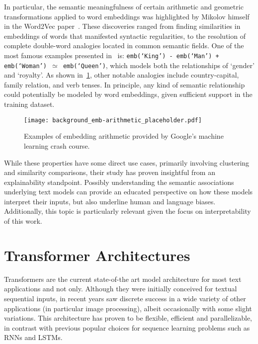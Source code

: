 In particular, the semantic meaningfulness of certain arithmetic and geometric transformations applied to word embeddings was highlighted by Mikolov himself in the Word2Vec paper~\cite{mikolov2013}.
These discoveries ranged from finding similarities in embeddings of words that manifested syntactic regularities, to the resolution of complete double-word analogies located in common semantic fields.
One of the most famous examples presented in~\cite{mikolov2013} is: \texttt{emb(`King') - emb(`Man') + emb(`Woman') $\simeq$ emb(`Queen')}, which models both the relationships of `gender' and `royalty'. %
As shown in~\cref{fig:background_emb-arithmetic}, other notable analogies include country-capital, family relation, and verb tenses.
In principle, any kind of semantic relationship could potentially be modeled by word embeddings, given sufficient support in the training dataset.

\begin{figure}[t!]
    \centering
    \texttt{[image: background\_emb-arithmetic\_placeholder.pdf]}
    \caption[Examples of embedding arithmetic provided by Google's machine learning crash course]{Examples of embedding arithmetic provided by Google's machine learning crash course\footnotemark.}
    \label{fig:background_emb-arithmetic}
\end{figure}

While these properties have some direct use cases, primarily involving clustering and similarity comparisons, their study has proven insightful from an explainability standpoint.
Possibly understanding the semantic associations underlying text models can provide an educated perspective on how these models interpret their inputs, but also underline human and language biases.
Additionally, this topic is particularly relevant given the focus on interpretability of this work.

\section{Transformer Architectures}

Transformers are the current state-of-the art model architecture for most text applications and not only.
Although they were initially conceived for textual sequential inputs, in recent years saw discrete success in a wide variety of other applications (in particular image processing), albeit occasionally with some slight variations.
This architecture has proven to be flexible, efficient and parallelizable, in contrast with previous popular choices for sequence learning problems such as RNNs and LSTMs.

